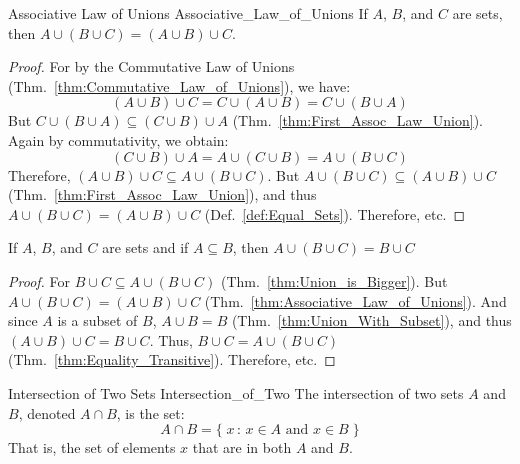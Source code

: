 \documentclass[crop=false,class=book,oneside]{standalone}
\begin{document}
            \begin{ltheorem}{Associative Law of Unions}
                  {Associative_Law_of_Unions}
                If $A$, $B$, and $C$ are sets, then
                $A\cup(B\cup{C})=(A\cup{B})\cup{C}$.
            \end{ltheorem}
            \begin{proof}
                For by the Commutative Law of Unions
                (Thm.~\ref{thm:Commutative_Law_of_Unions}),
                we have:
                \begin{equation}
                    (A\cup{B})\cup{C}=C\cup(A\cup{B})
                                     =C\cup(B\cup{A})
                \end{equation}
                But $C\cup(B\cup{A})\subseteq(C\cup{B})\cup{A}$
                (Thm.~\ref{thm:First_Assoc_Law_Union}). Again by
                commutativity, we obtain:
                \begin{equation}
                    (C\cup{B})\cup{A}=A\cup(C\cup{B})
                                     =A\cup(B\cup{C})
                \end{equation}
                Therefore,
                $(A\cup{B})\cup{C}\subseteq{A}\cup(B\cup{C})$.
                But $A\cup(B\cup{C})\subseteq(A\cup{B})\cup{C}$
                (Thm.~\ref{thm:First_Assoc_Law_Union}),
                and thus $A\cup(B\cup{C})=(A\cup{B})\cup{C}$
                (Def.~\ref{def:Equal_Sets}). Therefore, etc.
            \end{proof}
            \begin{theorem}
                \label{thm:Redundant_Union}%
                If $A$, $B$, and $C$ are sets and if
                $A\subseteq{B}$, then
                $A\cup(B\cup{C})=B\cup{C}$
            \end{theorem}
            \begin{proof}
                For $B\cup{C}\subseteq{A}\cup(B\cup{C})$
                (Thm.~\ref{thm:Union_is_Bigger}). But
                $A\cup(B\cup{C})=(A\cup{B})\cup{C}$
                (Thm.~\ref{thm:Associative_Law_of_Unions}).
                And since $A$ is a subset of $B$,
                $A\cup{B}=B$ (Thm.~\ref{thm:Union_With_Subset}),
                and thus $(A\cup{B})\cup{C}=B\cup{C}$. Thus,
                $B\cup{C}=A\cup(B\cup{C})$
                (Thm.~\ref{thm:Equality_Transitive}).
                Therefore, etc.
            \end{proof}
            \begin{ldefinition}{Intersection of Two Sets}
                  {Intersection_of_Two}
                The intersection of two sets $A$ and $B$,
                denoted $A\cap{B}$, is the set:
                \begin{equation}
                    A\cap{B}
                    =\{\;x\,:\,x\in{A}\textrm{ and }x\in{B}\;\}
                \end{equation}
                That is, the set of elements $x$ that are in
                both $A$ and $B$.
            \end{ldefinition}
\end{document}
